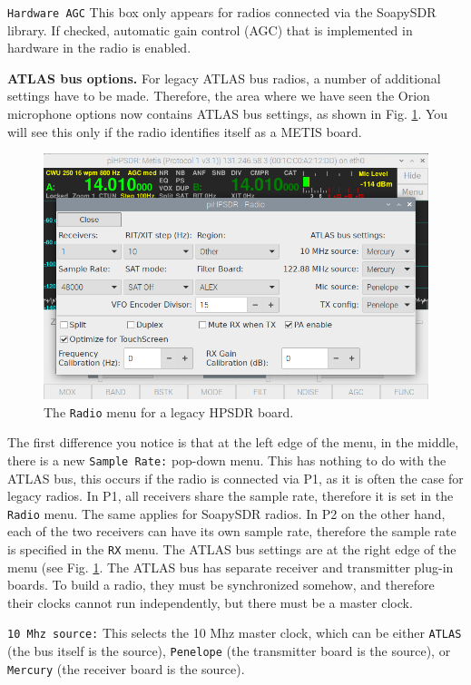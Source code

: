 \documentclass[12pt]{book}
\def\rett#1{\texttt{\color{red}#1}}
\def\bltt#1{\texttt{\color{blue}#1}}
\begin{document}
 \rett{Hardware AGC} This box only appears for radios connected via the SoapySDR library.
 If checked, automatic gain control (AGC) that is implemented in hardware in the radio is enabled.
 
 \textbf{ATLAS bus options.} For legacy ATLAS bus radios, a number of additional settings have to be
 made. Therefore, the area where we have seen the Orion microphone options now contains ATLAS bus
 settings, as shown in Fig. \ref{fig:RadioMenuMetis}. You will see this only if the radio identifies
 itself as a METIS board.
  
\begin{figure}[h]
\center
\includegraphics[width=12cm]{RadioMenuMetis.png}
\caption{The \bltt{Radio} menu for a legacy HPSDR board.}
\label{fig:RadioMenuMetis}
\end{figure}

The first difference you notice is that at the left edge of the menu, in the middle,
there is a new \rett{Sample Rate:} pop-down menu. This has nothing to do with the
ATLAS bus, this occurs if the radio is connected via P1, as it is often the case for
legacy radios. In P1, all receivers share the sample rate, therefore it is set in the
\bltt{Radio} menu. The same applies for SoapySDR radios. In P2 on the other hand, each
of the two receivers can have its own sample rate, therefore the sample rate is specified
in the \bltt{RX} menu. The ATLAS bus settings are at the right edge of the menu (see Fig.
\ref{fig:RadioMenuMetis}. The ATLAS bus has separate receiver and transmitter plug-in boards.
To build a radio, they must be synchronized somehow, and therefore their clocks cannot run
independently, but there must be a master clock.

\rett{10 Mhz source:} This selects the 10 Mhz master clock, which can be either \texttt{ATLAS}
(the bus itself is the source), \texttt{Penelope} (the transmitter board is the source),
or \texttt{Mercury} (the receiver board is the source).
\end{document}

